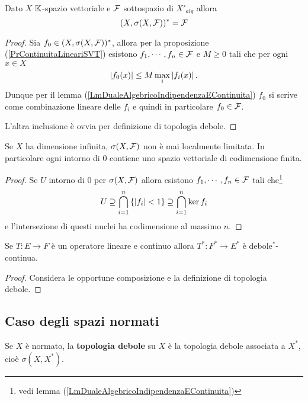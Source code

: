 \begin{proposition}\label{PrDualePerTopologiaDebole}
Dato $X$ $\mathbb{K}$-spazio vettoriale e $\mathcal{F}$ sottospazio di $X'_{alg}$ allora
\[(X,\sigma(X,\mathcal{F}))^\ast=\mathcal{F}\]
\end{proposition}
\begin{proof}
Sia $f_0\in (X,\sigma(X,\mathcal{F}))^\ast$, allora per la proposizione (\ref{PrContinuitaLineariSVT}) esistono $f_1,\cdots, f_n\in\mathcal{F}$ e $M\geq0$ tali che per ogni $x\in X$
\[\left|{f_0(x)}\right|\leq M\max_{i}\left|{f_i(x)}\right|.\]
Dunque per il lemma (\ref{LmDualeAlgebricoIndipendenzaEContinuita}) $f_0$ si scrive come combinazione lineare delle $f_i$ e quindi in particolare $f_0\in\mathcal{F}$.

L'altra inclusione \`e ovvia per definizione di topologia debole.
\end{proof}

\begin{remark}
Se $X$ ha dimensione infinita, $\sigma(X,\mathcal{F})$ non \`e mai localmente limitata. In particolare ogni intorno di $0$ contiene uno spazio vettoriale di codimensione finita.
\end{remark}
\begin{proof}
Se $U$ intorno di $0$ per $\sigma(X,\mathcal{F})$ allora esistono $f_1,\cdots,f_n\in\mathcal{F}$ tali che\footnote{vedi lemma (\ref{LmDualeAlgebricoIndipendenzaEContinuita})}
\[U\supseteq \bigcap_{i=1}^n\left\{{\left|{f_i}\right|<1}\right\}\supseteq \bigcap_{i=1}^n \ker f_i\]
e l'intersezione di questi nuclei ha codimensione al massimo $n$.
\end{proof}

\begin{proposition}\label{PrDualeOperatoreContinuoEDeboleStarContinua}
Se $T:E\to F$ \`e un operatore lineare e continuo allora $T^\ast:F^\ast\to E^\ast$ \`e debole$^\ast$-continua.
\end{proposition}
\begin{proof}
Considera le opportune composizione e la definizione di topologia debole.
\end{proof}

\subsection{Caso degli spazi normati}

\begin{definition}
Se $X$ \`e normato, la \textbf{topologia debole} su $X$ \`e la topologia debole associata a $X^\ast$, cio\`e $\sigma(X,X^\ast)$.
\end{definition}

